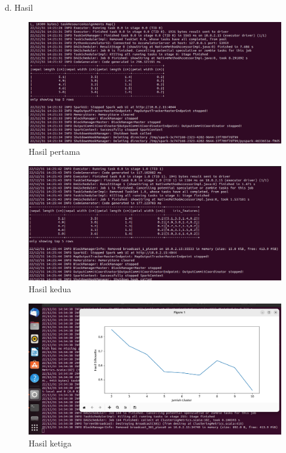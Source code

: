 \begin{enumerate}
d. Hasil 

\begin{figure}[!ht]
\includegraphics[width=\textwidth]{TugasKelompok/Kelompok1/hasil1}
\caption{Hasil pertama}
\label{gam:hasil1}
\end{figure}

\begin{figure}[!ht]
\includegraphics[width=\textwidth]{TugasKelompok/Kelompok1/hasil2}
\caption{Hasil kedua}
\label{gam:hasil2}
\end{figure}

\newpage
\begin{figure}[!ht]
\includegraphics[width=\textwidth]{TugasKelompok/Kelompok1/hasil3}
\caption{Hasil ketiga}
\label{gam:hasil3}
\end{figure}


\end{enumerate}
